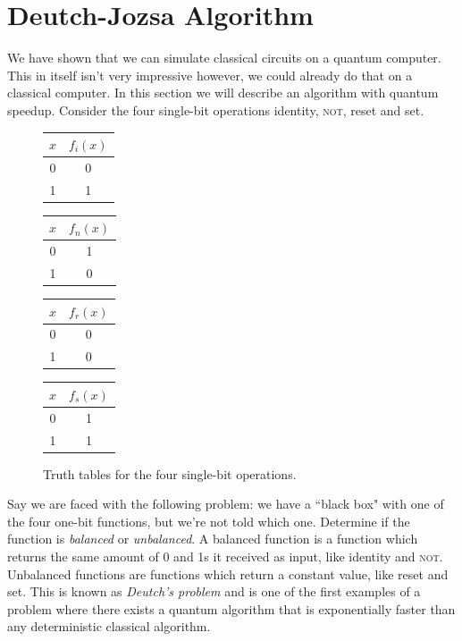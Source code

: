 \documentclass[11pt, notitlepage]{report}
\begin{document}
\section{Deutch-Jozsa Algorithm}
We have shown that we can simulate classical circuits on a quantum computer. This in itself isn't very impressive however, we could already do that on a classical computer. In this section we will describe an algorithm with quantum speedup. Consider the four single-bit operations identity, \textsc{not}, reset and set. 

\begin{figure}[ht]
  \centering
  \begin{multicols}{4}
    \begin{tabular}{c|c}
    $x$ & $f_i(x)$ \\ \hline
    0 & 0 \\
    1 & 1 \\
    \end{tabular}

    \begin{tabular}{c|c}
    $x$ & $f_n(x)$ \\ \hline
    0 & 1 \\
    1 & 0 \\
    \end{tabular}

    \begin{tabular}{c|c}
    $x$ & $f_r(x)$ \\ \hline
    0 & 0 \\
    1 & 0 \\
    \end{tabular}

    \begin{tabular}{c|c}
    $x$ & $f_s(x)$ \\ \hline
    0 & 1 \\
    1 & 1 \\
   \end{tabular}
  \end{multicols}

  \vspace{4mm}
  \caption{Truth tables for the four single-bit operations.}
  \label{fig:single_bit_operations}
\end{figure}
\noindent
Say we are faced with the following problem: we have a ``black box" with one of the four one-bit functions, but we're not told which one. Determine if the function is \emph{balanced} or \emph{unbalanced}. A balanced function is a function which returns the same amount of 0 and 1s it received as input, like identity and \textsc{not}. Unbalanced functions are functions which return a constant value, like reset and set. This is known as \emph{Deutch's problem} and is one of the first examples of a problem where there exists a quantum algorithm that is exponentially faster than any deterministic classical algorithm.
\end{document}
